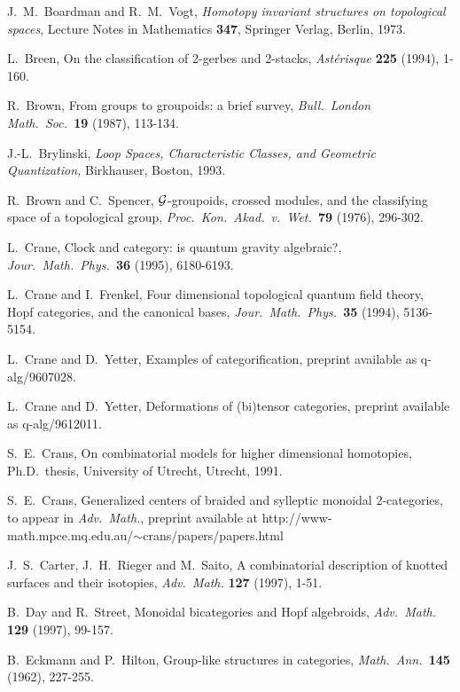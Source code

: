 {\begin{thebibliography}{10}
 J.\ M.\ Boardman and R.\ M.\ Vogt, {\sl Homotopy invariant
structures on topological spaces}, Lecture Notes in Mathematics
{\bf 347}, Springer Verlag, Berlin, 1973.

 L.\ Breen, On the classification of 2-gerbes and 2-stacks,
{\sl Ast\'erisque} {\bf 225} (1994), 1-160.

 R.\ Brown, From groups to groupoids: a brief survey, 
{\sl Bull.\ London Math.\ Soc.\ }{\bf 19} (1987), 113-134.

 J.-L.\ Brylinski, {\sl Loop Spaces, Characteristic
Classes, and Geometric Quantization,} Birkhauser, Boston, 1993.

 R.\ Brown and C.\ Spencer, $\cal G$-groupoids, crossed
modules, and the classifying space of a topological group, {\sl Proc.\ Kon.\
Akad.\ v.\ Wet.\ }{\bf 79} (1976), 296-302.

 L.\ Crane, Clock and category: is quantum gravity
algebraic?, {\sl Jour.\ Math.\ Phys.\ }{\bf 36} (1995), 6180-6193.

 L.\ Crane and I.\ Frenkel, Four dimensional topological
quantum field theory, Hopf categories, and the canonical bases, {\sl
Jour.\ Math.\ Phys.\ }{\bf 35} (1994), 5136-5154.  

 L.\ Crane and D.\ Yetter, Examples of categorification, 
preprint available as q-alg/9607028.  

 L.\ Crane and D.\ Yetter, Deformations of (bi)tensor
categories, preprint available as q-alg/9612011.

 S.\ E.\ Crans, On combinatorial models for
higher dimensional homotopies, Ph.D.\ thesis, University of Utrecht,
Utrecht, 1991.

 S.\ E.\ Crans, Generalized centers of braided and sylleptic
monoidal 2-categories, to appear in {\sl Adv.\ Math.}, preprint
available at http://www-math.mpce.mq.edu.au/$\sim$crans/papers/papers.html

 J.\ S.\ Carter, J.\ H.\ Rieger and M.\ Saito,  
A combinatorial description of knotted surfaces and their isotopies, 
{\sl Adv.\ Math.} {\bf 127} (1997), 1-51.

 B.\ Day and R.\ Street, Monoidal bicategories and Hopf
algebroids, {\sl Adv.\ Math.} {\bf 129} (1997), 99-157.

 B.\ Eckmann and P.\ Hilton, Group-like structures in
categories, {\sl Math.\ Ann.\ }{\bf 145} (1962), 227-255.


\end{thebibliography}}
